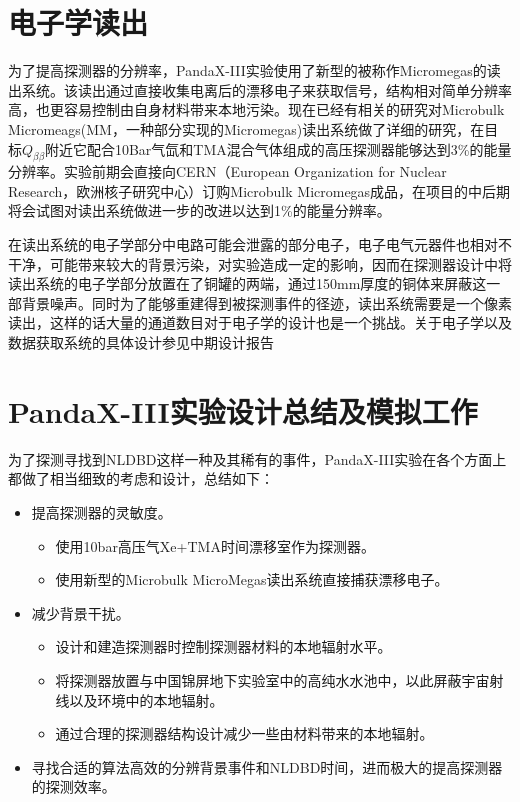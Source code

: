 \section{电子学读出}

为了提高探测器的分辨率，PandaX-III实验使用了新型的被称作Micromegas的读出系统。该读出通过直接收集电离后的漂移电子来获取信号，结构相对简单分辨率高，也更容易控制由自身材料带来本地污染。现在已经有相关的研究对Microbulk Micromeags(MM，一种部分实现的Micromegas)读出系统做了详细的研究，在目标$Q_{\beta\beta}$附近它配合10Bar气氙和TMA混合气体组成的高压探测器能够达到3\%的能量分辨率。实验前期会直接向CERN（European Organization for Nuclear Research，欧洲核子研究中心）订购Microbulk Micromegas成品，在项目的中后期将会试图对读出系统做进一步的改进以达到1\%的能量分辨率。

在读出系统的电子学部分中电路可能会泄露的部分电子，电子电气元器件也相对不干净，可能带来较大的背景污染，对实验造成一定的影响，因而在探测器设计中将读出系统的电子学部分放置在了铜罐的两端，通过150mm厚度的铜体来屏蔽这一部背景噪声。同时为了能够重建得到被探测事件的径迹，读出系统需要是一个像素读出，这样的话大量的通道数目对于电子学的设计也是一个挑战。关于电子学以及数据获取系统的具体设计参见中期设计报告\supercite{cdr}

\section{PandaX-III实验设计总结及模拟工作}

为了探测寻找到NLDBD这样一种及其稀有的事件，PandaX-III实验在各个方面上都做了相当细致的考虑和设计，总结如下：
\begin{itemize}
    \item 提高探测器的灵敏度。
    \begin{itemize}
        \item 使用10bar高压气Xe+TMA时间漂移室作为探测器。
        \item 使用新型的Microbulk MicroMegas读出系统直接捕获漂移电子。
    \end{itemize}
    \item 减少背景干扰。
    \begin{itemize}
        \item 设计和建造探测器时控制探测器材料的本地辐射水平。
        \item 将探测器放置与中国锦屏地下实验室中的高纯水水池中，以此屏蔽宇宙射线以及环境中的本地辐射。
        \item 通过合理的探测器结构设计减少一些由材料带来的本地辐射。
    \end{itemize}
    \item 寻找合适的算法高效的分辨背景事件和NLDBD时间，进而极大的提高探测器的探测效率。
\end{itemize}



